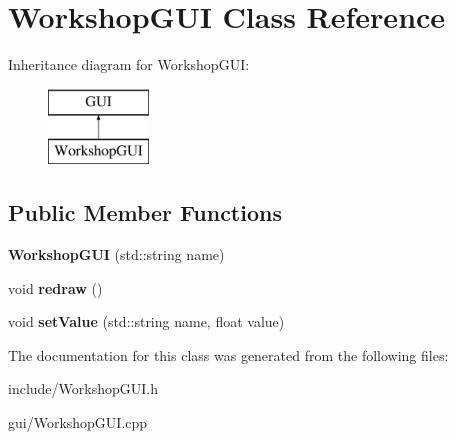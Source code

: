 \hypertarget{classWorkshopGUI}{}\section{Workshop\+G\+UI Class Reference}
\label{classWorkshopGUI}
Inheritance diagram for Workshop\+G\+UI\+:\begin{figure}[H]
\begin{center}
\leavevmode
\includegraphics[height=2.000000cm]{classWorkshopGUI}
\end{center}
\end{figure}
\subsection*{Public Member Functions}
\begin{DoxyCompactItemize}
\item 
{\bfseries Workshop\+G\+UI} (std\+::string name)\hypertarget{classWorkshopGUI_af4b636b395eafa6ac762a6ad241a922f}{}\label{classWorkshopGUI_af4b636b395eafa6ac762a6ad241a922f}

\item 
void {\bfseries redraw} ()\hypertarget{classWorkshopGUI_abaa68b1731ba8e97fcb73d10b948930b}{}\label{classWorkshopGUI_abaa68b1731ba8e97fcb73d10b948930b}

\item 
void {\bfseries set\+Value} (std\+::string name, float value)\hypertarget{classWorkshopGUI_a8bd7d110ea4396da32970c59ec4c86e7}{}\label{classWorkshopGUI_a8bd7d110ea4396da32970c59ec4c86e7}

\end{DoxyCompactItemize}


The documentation for this class was generated from the following files\+:\begin{DoxyCompactItemize}
\item 
include/Workshop\+G\+U\+I.\+h\item 
gui/Workshop\+G\+U\+I.\+cpp\end{DoxyCompactItemize}
